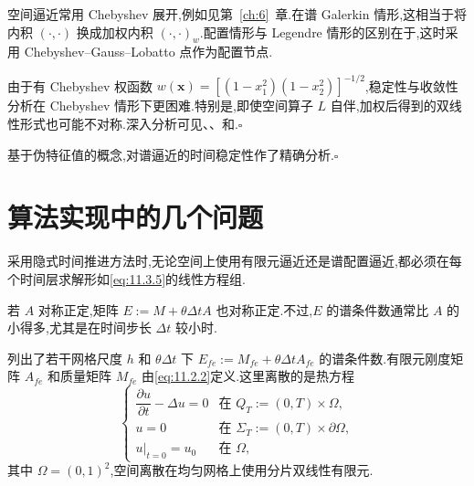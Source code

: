 \begin{note}
空间逼近常用 Chebyshev 展开,例如见第~\ref{ch:6}~章.在谱 Galerkin 情形,这相当于将内积 \((\cdot,\cdot)\) 换成加权内积 \((\cdot,\cdot)_w\).配置情形与 Legendre 情形的区别在于,这时采用 Chebyshev--Gauss--Lobatto 点作为配置节点.

由于有 Chebyshev 权函数 \(w(\boldsymbol{x})=[(1-x_1^2)(1-x_2^2)]^{-1/2}\),稳定性与收敛性分析在 Chebyshev 情形下更困难.特别是,即使空间算子 \(L\) 自伴,加权后得到的双线性形式也可能不对称.深入分析可见、、和.\hfill\(\square\)
\end{note}

\begin{note}
基于伪特征值的概念,对谱逼近的时间稳定性作了精确分析.\hfill\(\square\)
\end{note}

\section{算法实现中的几个问题}\label{sec:11.4}

采用隐式时间推进方法时,无论空间上使用有限元逼近还是谱配置逼近,都必须在每个时间层求解形如\eqref{eq:11.3.5}的线性方程组.

若 \(A\) 对称正定,矩阵 \(E:=M+\theta\Delta t A\) 也对称正定.不过,\(E\) 的谱条件数通常比 \(A\) 的小得多,尤其是在时间步长 \(\Delta t\) 较小时.

列出了若干网格尺度 \(h\) 和 \(\theta\Delta t\) 下 \(E_{fe}:=M_{fe}+\theta\Delta t A_{fe}\) 的谱条件数.有限元刚度矩阵 \(A_{fe}\) 和质量矩阵 \(M_{fe}\) 由\eqref{eq:11.2.2}定义.这里离散的是热方程
\begin{equation}\label{eq:11.4.1}
  \begin{cases}
    \dfrac{\partial u}{\partial t}-\Delta u=0 & \text{在 } Q_T:=(0,T)\times\Omega,\\[2pt]
    u=0 & \text{在 } \Sigma_T:=(0,T)\times\partial\Omega,\\
    u|_{t=0}=u_0 & \text{在 } \Omega,
  \end{cases}
\end{equation}
其中 \(\Omega=(0,1)^2\),空间离散在均匀网格上使用分片双线性有限元.

